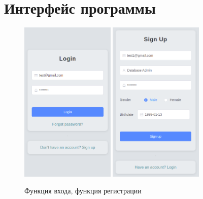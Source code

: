 
\vbox{}
\pagebreak

\vbox{}


\section{Интерфейс программы}


\begin{figure}[H]
    \centering
    \includegraphics[width=0.4\textwidth]{img/login.png}
    \includegraphics[width=0.4\textwidth]{img/signup.png}
    \caption{Функция входа, функция регистрации}
\end{figure}

